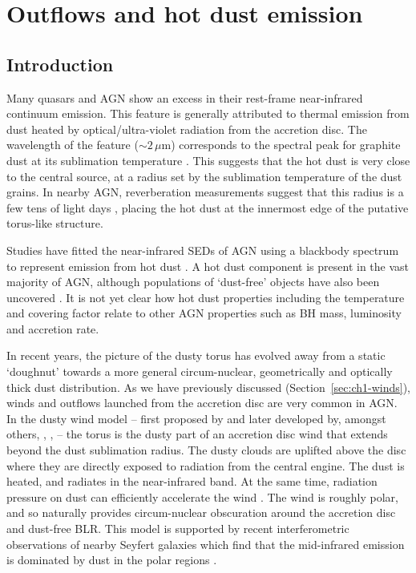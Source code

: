 
\chapter{Outflows and hot dust emission}
\label{ch:sed}


\section{Introduction}

Many quasars and AGN show an excess in their rest-frame near-infrared continuum emission.
This feature is generally attributed to thermal emission from dust heated by optical/ultra-violet radiation from the accretion disc.
The wavelength of the feature ($\sim2$\,$\mu$m) corresponds to the spectral peak for graphite dust at its sublimation temperature \citep[$T\sim1500$\,K;][]{barvainis87}.
This suggests that the hot dust is very close to the central source, at a radius set by the sublimation temperature of the dust grains.
In nearby AGN, reverberation measurements suggest that this radius is a few tens of light days \citep[e.g.][]{minezaki04,suganuma06}, placing the hot dust at the innermost edge of the putative torus-like structure.

Studies have fitted the near-infrared SEDs of AGN using a blackbody spectrum to represent emission from hot dust \citep[e.g.][]{edelson86,barvainis87,kishimoto07,mor09,riffel09,deo11,landt11,mor11,roseboom13}.
A hot dust component is present in the vast majority of AGN, although populations of `dust-free' objects have also been uncovered \citep{hao10,hao11,jiang10,mor11}.
It is not yet clear how hot dust properties including the temperature and covering factor relate to other AGN properties such as BH mass, luminosity and accretion rate.

In recent years, the picture of the dusty torus has evolved away from a static `doughnut' towards a more general circum-nuclear, geometrically and optically thick dust distribution.
As we have previously discussed (Section~\ref{sec:ch1-winds}), winds and outflows launched from the accretion disc are very common in AGN.
In the dusty wind model -- first proposed by \citet{konigl94} and later developed by, amongst others, \citet{everett05}, \citet{elitzur06}, \citet{keating12} -- the torus is the dusty part of an accretion disc wind that extends beyond the dust sublimation radius.
The dusty clouds are uplifted above the disc where they are directly exposed to radiation from the central engine.
The dust is heated, and radiates in the near-infrared band.
At the same time, radiation pressure on dust can efficiently accelerate the wind \citep[e.g.][]{fabian12}.
The wind is roughly polar, and so naturally provides circum-nuclear obscuration around the accretion disc and dust-free BLR.
This model is supported by recent interferometric observations of nearby Seyfert galaxies which find that the mid-infrared emission is dominated by dust in the polar regions \citep[e.g.][]{raban09,honig12,honig13,tristram14,lopez-gonzaga16}.

